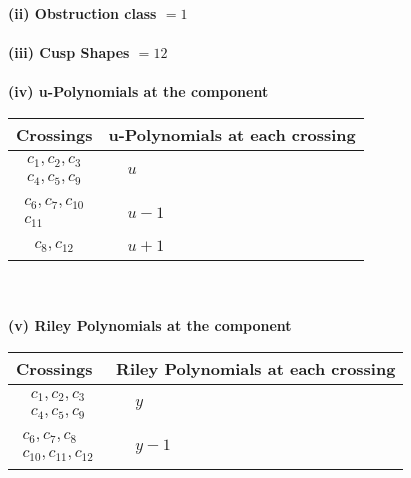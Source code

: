 \documentclass[1p]{elsarticle_modified}
\theoremstyle{definition}
\begin{document}
\flushleft \textbf{(ii) Obstruction class $= 1$}\\~\\
\flushleft \textbf{(iii) Cusp Shapes $= 12$}\\~\\
\newpage\renewcommand{\arraystretch}{1}
\flushleft \textbf{(iv) u-Polynomials at the component}\newline \\
\begin{tabular}{m{50pt}|m{274pt}}
Crossings & \hspace{64pt}u-Polynomials at each crossing \\
\hline $$\begin{aligned}c_{1},c_{2},c_{3}\\c_{4},c_{5},c_{9}\end{aligned}$$&$\begin{aligned}
&u
\end{aligned}$\\
\hline $$\begin{aligned}c_{6},c_{7},c_{10}\\c_{11}\end{aligned}$$&$\begin{aligned}
&u-1
\end{aligned}$\\
\hline $$\begin{aligned}c_{8},c_{12}\end{aligned}$$&$\begin{aligned}
&u+1
\end{aligned}$\\
\hline
\end{tabular}\\~\\
\newpage\renewcommand{\arraystretch}{1}
\flushleft \textbf{(v) Riley Polynomials at the component}\newline \\
\begin{tabular}{m{50pt}|m{274pt}}
Crossings & \hspace{64pt}Riley Polynomials at each crossing \\
\hline $$\begin{aligned}c_{1},c_{2},c_{3}\\c_{4},c_{5},c_{9}\end{aligned}$$&$\begin{aligned}
&y
\end{aligned}$\\
\hline $$\begin{aligned}c_{6},c_{7},c_{8}\\c_{10},c_{11},c_{12}\end{aligned}$$&$\begin{aligned}
&y-1
\end{aligned}$\\
\hline
\end{tabular}\\~\\
\end{document}
